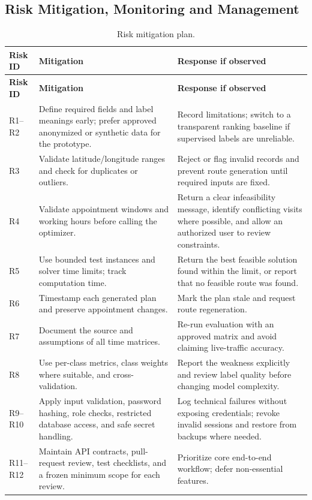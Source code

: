 \documentclass[12pt,a4paper,oneside]{report}
\begin{document}
\subsection{Risk Mitigation, Monitoring and Management}
\begin{longtable}{p{18mm}p{49mm}p{63mm}}
\caption{Risk mitigation plan.}\label{tab:risk-mitigation}\\
\toprule
\textbf{Risk ID} & \textbf{Mitigation} & \textbf{Response if observed}\\
\midrule
\endfirsthead
\toprule
\textbf{Risk ID} & \textbf{Mitigation} & \textbf{Response if observed}\\
\midrule
\endhead
R1--R2 & Define required fields and label meanings early; prefer approved anonymized or synthetic data for the prototype. & Record limitations; switch to a transparent ranking baseline if supervised labels are unreliable.\\
R3 & Validate latitude/longitude ranges and check for duplicates or outliers. & Reject or flag invalid records and prevent route generation until required inputs are fixed.\\
R4 & Validate appointment windows and working hours before calling the optimizer. & Return a clear infeasibility message, identify conflicting visits where possible, and allow an authorized user to review constraints.\\
R5 & Use bounded test instances and solver time limits; track computation time. & Return the best feasible solution found within the limit, or report that no feasible route was found.\\
R6 & Timestamp each generated plan and preserve appointment changes. & Mark the plan stale and request route regeneration.\\
R7 & Document the source and assumptions of all time matrices. & Re-run evaluation with an approved matrix and avoid claiming live-traffic accuracy.\\
R8 & Use per-class metrics, class weights where suitable, and cross-validation. & Report the weakness explicitly and review label quality before changing model complexity.\\
R9--R10 & Apply input validation, password hashing, role checks, restricted database access, and safe secret handling. & Log technical failures without exposing credentials; revoke invalid sessions and restore from backups where needed.\\
R11--R12 & Maintain API contracts, pull-request review, test checklists, and a frozen minimum scope for each review. & Prioritize core end-to-end workflow; defer non-essential features.\\
\bottomrule
\end{longtable}
\end{document}
